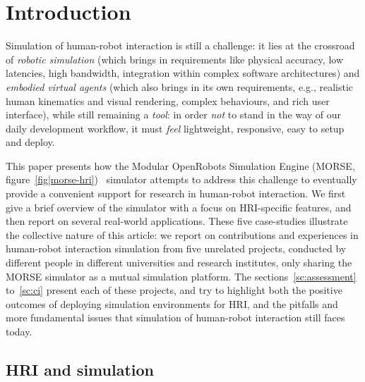 \documentclass[conference]{IEEEtran}
\begin{document}
\IEEEpeerreviewmaketitle

\section{Introduction}

Simulation of human-robot interaction is still a challenge: it lies at the crossroad
of \emph{robotic simulation} (which brings in requirements like physical
accuracy, low latencies, high bandwidth, integration within complex software
architectures) and \emph{embodied virtual agents} (which also brings in its own
requirements, e.g., realistic human kinematics and visual rendering, complex
behaviours, and rich user interface), while still remaining a \emph{tool}: in order
\emph{not} to stand in the way of our daily development workflow, it must
\emph{feel} lightweight, responsive, easy to setup and deploy.

This paper presents how the Modular OpenRobots Simulation Engine (MORSE,
figure~\ref{fig|morse-hri})~\cite{morse_simpar_2012} simulator attempts to
address this challenge to eventually provide a convenient support for research
in human-robot interaction. We first give a brief overview of the simulator
with a focus on HRI-specific features, and then report on several real-world
applications. These five case-studies illustrate the collective nature of this
article: we report on contributions and experiences in human-robot interaction
simulation from five unrelated projects, conducted by different people in
different universities and research institutes, only sharing the MORSE simulator
as a mutual simulation platform. The sections~\ref{sc:assessment} to~\ref{sc:ci}
present each of these projects, and try to highlight both the positive
outcomes of deploying simulation environments for HRI, and the pitfalls and more
fundamental issues that simulation of human-robot interaction still faces today.

\subsection*{HRI and simulation}
\end{document}
